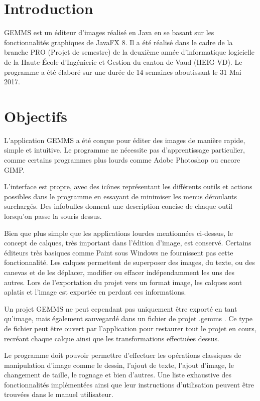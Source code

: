 \section{Introduction}
GEMMS est un éditeur d'images réalisé en Java en se basant sur les fonctionnalités graphiques de JavaFX 8. Il a été réalisé dans le cadre de la branche PRO (Projet de semestre) de la deuxième année d'informatique logicielle de la Haute-École d'Ingénierie et Gestion du canton de Vaud (HEIG-VD). 
Le programme a été élaboré sur une durée de 14 semaines aboutissant le 31 Mai 2017.

\section{Objectifs}
L'application GEMMS a été conçue pour éditer des images de manière rapide, simple et intuitive. Le programme ne nécessite pas d'apprentissage particulier, comme certains programmes plus lourds comme Adobe Photoshop ou encore GIMP.

L'interface est propre, avec des icônes représentant les différents outils et actions possibles dans le programme en essayant de minimiser les menus déroulants surchargés. Des infobulles donnent une description concise de chaque outil lorsqu'on passe la souris dessus.

Bien que plus simple que les applications lourdes mentionnées ci-dessus, le concept de calques, très important dans l'édition d'image, est conservé. Certains éditeurs très basiques comme Paint sous Windows ne fournissent pas cette fonctionnalité. Les calques permettent de superposer des images, du texte, ou des canevas et de les déplacer, modifier ou effacer indépendamment les uns des autres. Lors de l'exportation du projet vers un format image, les calques sont aplatis et l'image est exportée en perdant ces informations.

Un projet GEMMS ne peut cependant pas uniquement être exporté en tant qu'image, mais également sauvegardé dans un fichier de projet \og.gemms \fg{}. Ce type de fichier peut être ouvert par l'application pour restaurer tout le projet en cours, recréant chaque calque ainsi que les transformations effectuées dessus.

Le programme doit pouvoir permettre d'effectuer les opérations classiques de manipulation d'image comme le dessin, l'ajout de texte, l'ajout d'image, le changement de taille, le rognage et bien d'autres. Une liste exhaustive des fonctionnalités implémentées ainsi que leur instructions d'utilisation peuvent être trouvées dans le manuel utilisateur.